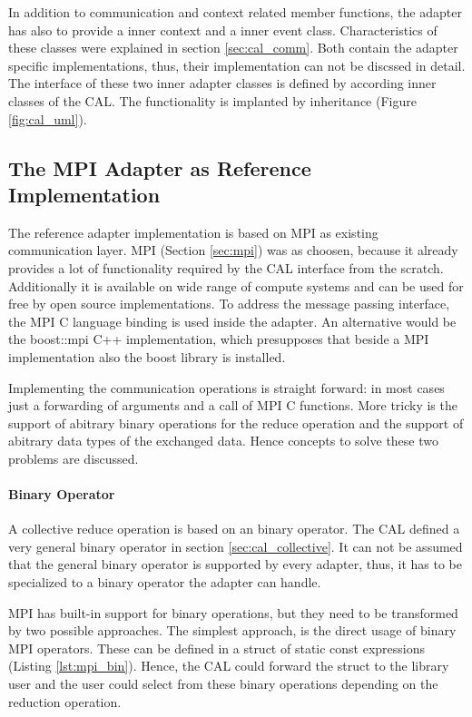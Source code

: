 In addition to communication and context related member functions, the
adapter has also to provide a inner context and a inner event
class. Characteristics of these classes were explained in section
\ref{sec:cal_comm}. Both contain the adapter specific implementations,
thus, their implementation can not be discssed in detail. The
interface of these two inner adapter classes is defined by according
inner classes of the CAL. The functionality is implanted by
inheritance (Figure \ref{fig:cal_uml}).


\subsection{The MPI Adapter as Reference Implementation}
\label{sec:cal_mpi_adapter}
The reference adapter implementation is based on MPI as existing
communication layer.  MPI (Section \ref{sec:mpi}) was as choosen,
because it already provides a lot of functionality required by the CAL
interface from the scratch. Additionally it is available on wide range
of compute systems and can be used for free by open source
implementations. To address the message passing interface, the MPI C
language binding is used inside the adapter. An alternative would be
the boost::mpi C++ implementation, which presupposes that beside a MPI
implementation also the boost library is installed.

Implementing the communication operations is straight forward: in most
cases just a forwarding of arguments and a call of MPI C
functions. More tricky is the support of abitrary binary operations
for the reduce operation and the support of abitrary data types of the
exchanged data. Hence concepts to solve these two problems are
discussed.

\paragraph*{Binary Operator}

A collective reduce operation is based on an binary operator. The CAL
defined a very general binary operator in section
\ref{sec:cal_collective}. It can not be assumed that the general
binary operator is supported by every adapter, thus, it has to be
specialized to a binary operator the adapter can handle.


MPI has built-in support for binary operations, but they need to be
transformed by two possible approaches.  The simplest approach, is the
direct usage of binary MPI operators.  These can be defined in a
struct of static const expressions (Listing \ref{lst:mpi_bin}).
Hence, the CAL could forward the struct to the library user and the
user could select from these binary operations depending on the
reduction operation.

